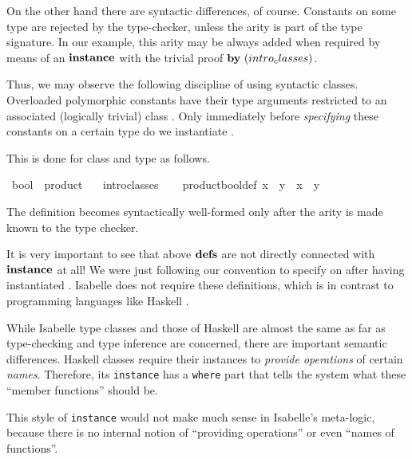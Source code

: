 \begin{isabellebody}
\begin{isamarkuptext}
 On the other hand there are syntactic differences, of course.
 Constants \isa{{\isasymodot}} on some type \isa{{\isasymtau}} are rejected by the
 type-checker, unless the arity  is part of the
 type signature.  In our example, this arity may be always added when
 required by means of an ${\mathord{\mathbf{instance}}}$ with the trivial
 proof $\BY{intro_classes}$.

 \medskip Thus, we may observe the following discipline of using
 syntactic classes.  Overloaded polymorphic constants have their type
 arguments restricted to an associated (logically trivial) class
 .  Only immediately before \emph{specifying} these constants
 on a certain type \isa{{\isasymtau}} do we instantiate .

 This is done for class  and type  as
 follows.%
\end{isamarkuptext}%
\ bool\ {\isacharcolon}{\isacharcolon}\ product\isanewline
\ \ \ intro{\isacharunderscore}classes\isanewline
{}\ {\isacharparenleft}\isanewline
\ \ product{\isacharunderscore}bool{\isacharunderscore}def{\isacharcolon}\ {\isachardoublequote}x\ {\isasymodot}\ y\ {\isasymequiv}\ x\ {\isasymand}\ y{\isachardoublequote}%
\begin{isamarkuptext}%
The definition  becomes syntactically
 well-formed only after the arity  is made
 known to the type checker.

 \medskip It is very important to see that above ${\mathord{\mathbf{defs}}}$ are not
 directly connected with ${\mathord{\mathbf{instance}}}$ at all!  We were
 just following our convention to specify \isa{{\isasymodot}} on 
 after having instantiated .  Isabelle does
 not require these definitions, which is in contrast to programming
 languages like Haskell \cite{haskell-report}.

 \medskip While Isabelle type classes and those of Haskell are almost
 the same as far as type-checking and type inference are concerned,
 there are important semantic differences.  Haskell classes require
 their instances to \emph{provide operations} of certain \emph{names}.
 Therefore, its \texttt{instance} has a \texttt{where} part that tells
 the system what these ``member functions'' should be.

 This style of \texttt{instance} would not make much sense in
 Isabelle's meta-logic, because there is no internal notion of
 ``providing operations'' or even ``names of functions''.%
\end{isamarkuptext}%
\end{isabellebody}%
